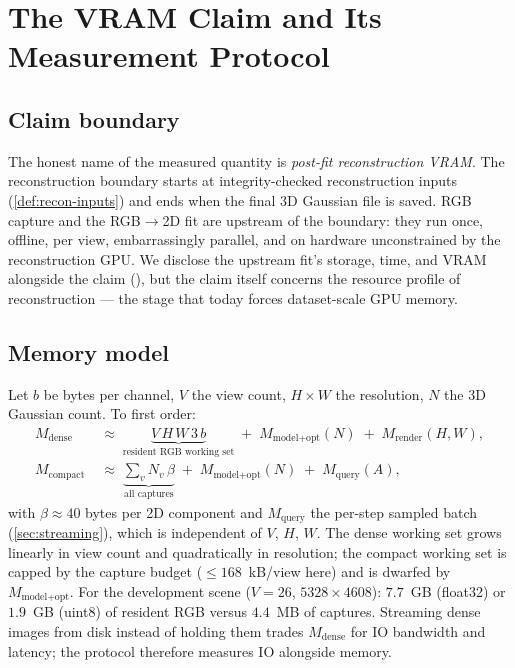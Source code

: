 \section{The VRAM Claim and Its Measurement Protocol}
\label{sec:vram-protocol}

\subsection{Claim boundary}
\label{sec:claim-boundary}

The honest name of the measured quantity is \emph{post-fit reconstruction VRAM}.  The
reconstruction boundary starts at integrity-checked reconstruction inputs
(\cref{def:recon-inputs}) and ends when the final 3D Gaussian file is saved.  RGB capture and
the RGB$\to$2D fit are upstream of the boundary: they run once, offline, per view,
embarrassingly parallel, and on hardware unconstrained by the reconstruction GPU.  We disclose
the upstream fit's storage, time, and VRAM alongside the claim
(), but the claim itself concerns the resource profile
of reconstruction --- the stage that today forces dataset-scale GPU memory.

\subsection{Memory model}
\label{sec:memory-model}

Let $b$ be bytes per channel, $V$ the view count, $H \times W$ the resolution, $N$ the 3D
Gaussian count.  To first order:
\begin{align}
  M_{\text{dense}} &\;\approx\; \underbrace{V \, H \, W \, 3\, b}_{\text{resident RGB working set}}
    \;+\; M_{\text{model+opt}}(N) \;+\; M_{\text{render}}(H, W),
  \label{eq:mem-dense}\\[2pt]
  M_{\text{compact}} &\;\approx\; \underbrace{\textstyle\sum_{v} N_v \, \beta}_{\text{all captures}}
    \;+\; M_{\text{model+opt}}(N) \;+\; M_{\text{query}}(A),
  \label{eq:mem-compact}
\end{align}
with $\beta \approx 40$ bytes per 2D component and $M_{\text{query}}$ the per-step sampled
batch (\cref{sec:streaming}), which is independent of $V$, $H$, $W$.  The dense working set
grows linearly in view count and quadratically in resolution; the compact working set is
capped by the capture budget ($\le 168$~kB/view here) and is dwarfed by
$M_{\text{model+opt}}$.  For the development scene ($V{=}26$, $5328 \times 4608$):
$7.7$~GB (float32) or $1.9$~GB (uint8) of resident RGB versus $4.4$~MB of captures.
Streaming dense images from disk instead of holding them trades
$M_{\text{dense}}$ for IO bandwidth and latency; the protocol therefore measures IO alongside
memory.

